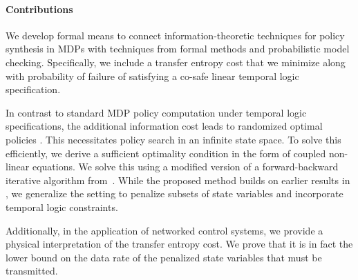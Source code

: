\paragraph*{\textbf{Contributions}} We develop formal means to connect information-theoretic techniques for policy synthesis in MDPs with techniques from formal methods and probabilistic model checking. Specifically, we include a transfer entropy cost that we  minimize along with probability of failure of satisfying a co-safe linear temporal logic specification. 

In contrast to standard MDP policy computation under temporal logic specifications, the additional information cost leads to randomized optimal policies \cite{tanaka2017lqg,Todorov09,takashi17}. This necessitates policy search in an infinite state space. To solve this efficiently, we derive a sufficient optimality condition in the form of coupled non-linear equations. We solve this using a modified version of a forward-backward iterative algorithm from~\cite{Blahut72}. While the proposed method builds on earlier results in \cite{takashi17}, we generalize the setting to penalize subsets of state variables and incorporate temporal logic constraints. 

Additionally, in the application of networked control systems, we provide a physical interpretation of the transfer entropy cost. We prove that it is in fact the lower bound on the data rate of the penalized state variables that must be transmitted.




